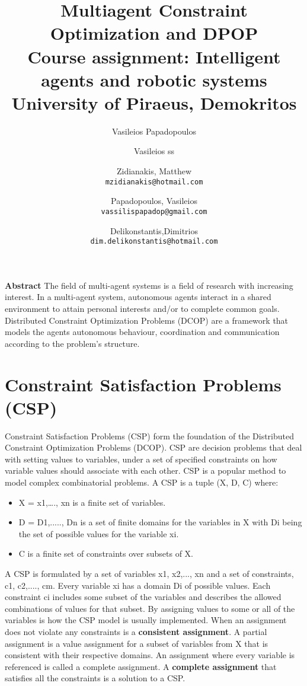 \documentclass[11pt,a4paper,onecolumn]{article}
\title{%
	Multiagent Constraint Optimization and DPOP\\
	\large Course assignment: Intelligent agents and robotic systems \\
	University of Piraeus, Demokritos}
\author{Vasileios Papadopoulos}
\author{Vasileios ss}
\author{
	Zidianakis, Matthew\\
	\texttt{mzidianakis@hotmail.com}
	\and
	Papadopoulos, Vasileios\\
	\texttt{vassilispapadop@gmail.com}
	\and
	Delikonstantis,Dimitrios\\
	\texttt{dim.delikonstantis@hotmail.com}
}
\begin{document}
	\maketitle
	
	\textbf{Abstract}
	The field of multi-agent systems is a field of research with increasing interest. In a multi-agent system, autonomous agents interact in a shared environment to attain personal interests and/or to complete common goals. Distributed Constraint Optimization Problems (DCOP) are a framework that models the agents autonomous behaviour, coordination and communication according to the problem's structure.
	
	\section{Constraint Satisfaction Problems (CSP)}
	Constraint Satisfaction Problems (CSP) form the foundation of the Distributed Constraint Optimization Problems (DCOP). CSP are decision problems that deal with setting values to variables, under a set of specified constraints on how variable values should associate with each other. CSP is a popular method to model complex combinatorial problems.
	A CSP is a tuple (X, D, C) where:
	\begin{itemize}
		\item X = {x1,…., xn} is a finite set of variables. 
		\item D = {D1,....., Dn} is a set of finite domains for the variables in X with Di being the set of possible values for the variable xi.
		\item C is a finite set of constraints over subsets of X.
	\end{itemize}
	
	A CSP is formulated by a set of variables x1, x2,..., xn and a set of constraints, c1, c2,...., cm. Every variable xi has a domain Di of possible values. Each constraint ci includes some subset of the variables and describes the allowed combinations of values for that subset. By assigning values to some or all of the variables is how the CSP model is usually implemented. When an assignment does not violate any constraints is a \textbf{consistent assignment}. A partial assignment is a value assignment for a subset of variables from X that is consistent with their respective domains. An assignment where every variable is referenced is called a complete assignment. A \textbf{complete assignment} that satisfies all the constraints is a solution to a CSP.
	
\end{document}
